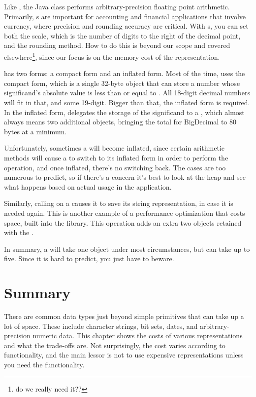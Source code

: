 Like , the Java class  performs
arbitrary-precision floating point arithmetic. Primarily,
s are important for accounting and financial applications that
involve currency, where precision and rounding accuracy are critical. With s,
you can set both the scale, which is the number of digits to the right of the
decimal point, and the rounding method. How to do this is beyond our scope and
covered elsewhere\footnote{do we really need it??}, since our focus is on the
memory cost of the representation.

 has two forms: a compact form and an
inflated form. Most of the time,  uses the compact form,
which is a single 32-byte object that can store a number whose significand's
absolute value is less than or equal to .
All 18-digit decimal numbers will fit in that, and some 19-digit.  Bigger than
that, the inflated form is required. In the inflated form, 
delegates the storage of the significand to a , which almost always means two additional
objects, bringing the total for BigDecimal to 80 bytes at a
minimum.  

Unfortunately, sometimes a  will become inflated,
since certain arithmetic methods will cause a  to switch to its inflated form in order to perform the operation, and once inflated,
there's no switching back.  The cases are too numerous to predict, so if there's
a concern it's best to look at the heap and see what happens based on actual usage in the 
application.

Similarly, calling  on a  causes it to
save its string representation, in case it is needed again.
This is another example of a performance optimization that 
costs space, built into the library.  This operation adds an extra two objects
retained with the . 

In summary, a  will take one
object under most circumstances, but can take up to five. Since it is hard to
predict, you just have to beware.

\section{Summary} 

There are common data types just beyond simple primitives that can
take up a lot of space.  These include character strings, bit sets, dates, and
arbitrary-precision numeric data. This chapter shows the costs of various
representations and what the trade-offs are. Not surprisingly, the cost varies
according to functionality, and the main lessor is not to use expensive
representations unless you need the functionality.


